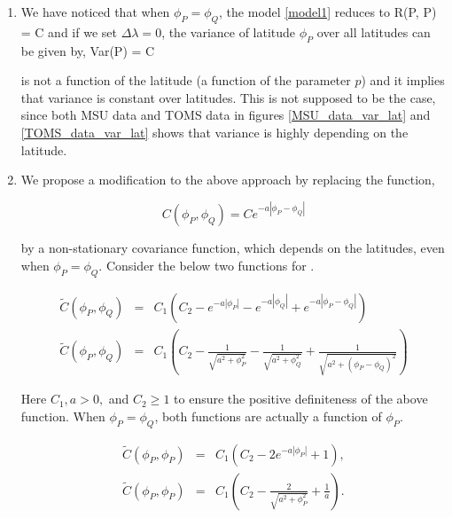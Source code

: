 	\begin{enumerate}
				
		\item We have noticed that when $\phi_P = \phi_Q$, the model \ref{model1} reduces to
		      \beq
		      \nonumber
		      R(P, P) = C
		      \eeq
		      and if we set $\Delta \lambda = 0$, the variance of latitude $\phi_P$ over all latitudes can be given by,
		      \beq
		      \nonumber
		      Var(P) = C
		      \eeq
		      		      
		      is not a function of the latitude (a function of the parameter $p$) and it implies that variance is constant over latitudes. This is not supposed to be the case, since both MSU data and TOMS data in figures \ref{MSU_data_var_lat} and \ref{TOMS_data_var_lat} shows that variance is highly depending on the latitude.
		      		      
		\item We propose a modification to the above approach by replacing the \Cm function,
		      		
		      \[
		      	C(\phi_P, \phi_Q) = Ce^{-a|\phi_P - \phi_Q|}
		      \]
		      		      
		      by a non-stationary covariance function, which depends on the latitudes, even when $\phi_P = \phi_Q$. Consider the below two functions for \Cm.
		      		      
		      \begin{eqnarray}
		      	\label{Cm_model1}
		      	\tilde{C}(\phi_P, \phi_Q) &=& C_1(C_2 - e^{-a|\phi_P|} - e^{-a|\phi_Q|} + e^{-a|\phi_P - \phi_Q|}) \\
		      	\label{Cm_model2}
		      	\tilde{C}(\phi_P, \phi_Q) &=& C_1\left(C_2 - \frac{1}{\sqrt{a^2+\phi_P^2}} - \frac{1}{\sqrt{a^2+\phi_Q^2}} + \frac{1}{\sqrt{a^2+(\phi_P-\phi_Q)^2}}\right)
		      \end{eqnarray}
		      		      
		      Here $C_1, a > 0,$ and $C_2 \ge 1$ to ensure the positive definiteness of the above function. When $\phi_P = \phi_Q$, both functions are actually a function of $\phi_P$.
		      		      
		      \begin{eqnarray*}
		      	\tilde{C}(\phi_P, \phi_P) &=& C_1(C_2 - 2e^{-a|\phi_P|} + 1), \\
		      	\tilde{C}(\phi_P, \phi_P) &=& C_1\left(C_2 - \frac{2}{\sqrt{a^2+\phi_P^2}} + \frac{1}{a}\right).
		      \end{eqnarray*}
		      		      

\end{enumerate}
